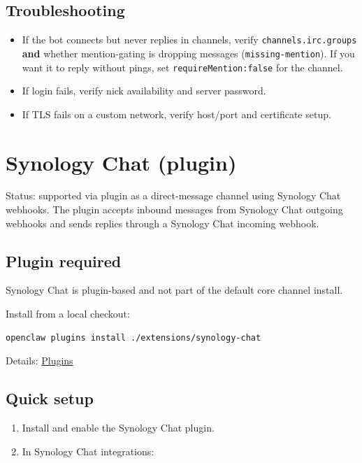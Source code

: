 \subsection{Troubleshooting}


\begin{itemize}
  \item If the bot connects but never replies in channels, verify \texttt{channels.irc.groups} \textbf{and} whether mention-gating is dropping messages (\texttt{missing-mention}). If you want it to reply without pings, set \texttt{requireMention:false} for the channel.
  \item If login fails, verify nick availability and server password.
  \item If TLS fails on a custom network, verify host/port and certificate setup.
\end{itemize}



\clearpage

\section{Synology Chat (plugin)}


Status: supported via plugin as a direct-message channel using Synology Chat webhooks.
The plugin accepts inbound messages from Synology Chat outgoing webhooks and sends replies
through a Synology Chat incoming webhook.

\subsection{Plugin required}


Synology Chat is plugin-based and not part of the default core channel install.

Install from a local checkout:

\begin{lstlisting}[language=bash]
openclaw plugins install ./extensions/synology-chat
\end{lstlisting}


Details: \href{/tools/plugin}{Plugins}

\subsection{Quick setup}


\begin{enumerate}
  \item Install and enable the Synology Chat plugin.
  \item In Synology Chat integrations:
\end{enumerate}

